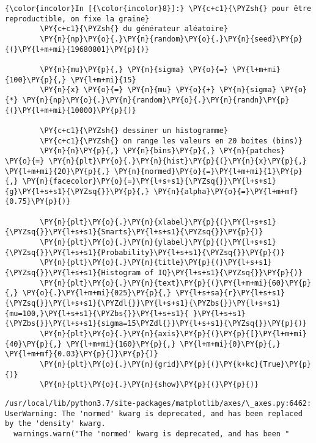     \begin{Verbatim}[commandchars=\\\{\}]
{\color{incolor}In [{\color{incolor}8}]:} \PY{c+c1}{\PYZsh{} pour être reproductible, on fixe la graine}
        \PY{c+c1}{\PYZsh{} du générateur aléatoire}
        \PY{n}{np}\PY{o}{.}\PY{n}{random}\PY{o}{.}\PY{n}{seed}\PY{p}{(}\PY{l+m+mi}{19680801}\PY{p}{)}
        
        \PY{n}{mu}\PY{p}{,} \PY{n}{sigma} \PY{o}{=} \PY{l+m+mi}{100}\PY{p}{,} \PY{l+m+mi}{15}
        \PY{n}{x} \PY{o}{=} \PY{n}{mu} \PY{o}{+} \PY{n}{sigma} \PY{o}{*} \PY{n}{np}\PY{o}{.}\PY{n}{random}\PY{o}{.}\PY{n}{randn}\PY{p}{(}\PY{l+m+mi}{10000}\PY{p}{)}
        
        \PY{c+c1}{\PYZsh{} dessiner un histogramme}
        \PY{c+c1}{\PYZsh{} on range les valeurs en 20 boites (bins)}
        \PY{n}{n}\PY{p}{,} \PY{n}{bins}\PY{p}{,} \PY{n}{patches} \PY{o}{=} \PY{n}{plt}\PY{o}{.}\PY{n}{hist}\PY{p}{(}\PY{n}{x}\PY{p}{,} \PY{l+m+mi}{20}\PY{p}{,} \PY{n}{normed}\PY{o}{=}\PY{l+m+mi}{1}\PY{p}{,} \PY{n}{facecolor}\PY{o}{=}\PY{l+s+s1}{\PYZsq{}}\PY{l+s+s1}{g}\PY{l+s+s1}{\PYZsq{}}\PY{p}{,} \PY{n}{alpha}\PY{o}{=}\PY{l+m+mf}{0.75}\PY{p}{)}
        
        \PY{n}{plt}\PY{o}{.}\PY{n}{xlabel}\PY{p}{(}\PY{l+s+s1}{\PYZsq{}}\PY{l+s+s1}{Smarts}\PY{l+s+s1}{\PYZsq{}}\PY{p}{)}
        \PY{n}{plt}\PY{o}{.}\PY{n}{ylabel}\PY{p}{(}\PY{l+s+s1}{\PYZsq{}}\PY{l+s+s1}{Probability}\PY{l+s+s1}{\PYZsq{}}\PY{p}{)}
        \PY{n}{plt}\PY{o}{.}\PY{n}{title}\PY{p}{(}\PY{l+s+s1}{\PYZsq{}}\PY{l+s+s1}{Histogram of IQ}\PY{l+s+s1}{\PYZsq{}}\PY{p}{)}
        \PY{n}{plt}\PY{o}{.}\PY{n}{text}\PY{p}{(}\PY{l+m+mi}{60}\PY{p}{,} \PY{o}{.}\PY{l+m+mi}{025}\PY{p}{,} \PY{l+s+sa}{r}\PY{l+s+s1}{\PYZsq{}}\PY{l+s+s1}{\PYZdl{}}\PY{l+s+s1}{\PYZbs{}}\PY{l+s+s1}{mu=100,}\PY{l+s+s1}{\PYZbs{}}\PY{l+s+s1}{ }\PY{l+s+s1}{\PYZbs{}}\PY{l+s+s1}{sigma=15\PYZdl{}}\PY{l+s+s1}{\PYZsq{}}\PY{p}{)}
        \PY{n}{plt}\PY{o}{.}\PY{n}{axis}\PY{p}{(}\PY{p}{[}\PY{l+m+mi}{40}\PY{p}{,} \PY{l+m+mi}{160}\PY{p}{,} \PY{l+m+mi}{0}\PY{p}{,} \PY{l+m+mf}{0.03}\PY{p}{]}\PY{p}{)}
        \PY{n}{plt}\PY{o}{.}\PY{n}{grid}\PY{p}{(}\PY{k+kc}{True}\PY{p}{)}
        \PY{n}{plt}\PY{o}{.}\PY{n}{show}\PY{p}{(}\PY{p}{)}
\end{Verbatim}


    \begin{Verbatim}[commandchars=\\\{\}]
/usr/local/lib/python3.7/site-packages/matplotlib/axes/\_axes.py:6462: UserWarning: The 'normed' kwarg is deprecated, and has been replaced by the 'density' kwarg.
  warnings.warn("The 'normed' kwarg is deprecated, and has been "

    \end{Verbatim}

